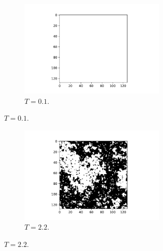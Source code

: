 \documentclass[10 pt, a4paper]{article}
\begin{document}
\begin{figure}[H] 
\begin{subfigure}[b]{0.33\textwidth}
\begin{figure}[H]
\includegraphics[width=\textwidth]{lattice128a}
\caption{$T = 0.1$.}
\end{figure}
\end{subfigure}
\begin{subfigure}[b]{0.33\textwidth}
\begin{figure}[H]
\includegraphics[width=\textwidth]{lattice128b}
\caption{$T = 2.2$.}
\end{figure}
\end{subfigure}
\begin{subfigure}[b]{0.33\textwidth}
\begin{figure}[H] 

\end{figure}
\end{subfigure}
\end{figure}
\end{document}
